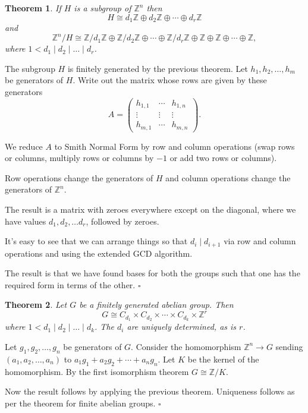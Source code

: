 \documentclass[10pt]{article}
\newtheorem{theorem}{Theorem}[section]
\newenvironment{proof}[1][Proof]{\begin{trivlist}
\item[\hskip \labelsep {\itshape #1}]}{\end{trivlist}}
\begin{document}
\begin{theorem}
If $H$ is a subgroup of $\mathbb{Z}^n$ then
$$H \cong d_1\mathbb{Z} \oplus d_2\mathbb{Z} \oplus \cdots \oplus d_r\mathbb{Z}$$ 
and
$$\mathbb{Z}^n/H \cong \mathbb{Z}/d_1\mathbb{Z} \oplus \mathbb{Z}/d_2\mathbb{Z} \oplus \cdots \oplus \mathbb{Z}/d_r\mathbb{Z}\oplus \mathbb{Z} \oplus \mathbb{Z} \oplus \cdots \oplus \mathbb{Z},$$
where $1 < d_1 \;|\; d_2 \;|\; \ldots \;|\; d_r$.
\end{theorem}

\begin{proof}
The subgroup $H$ is finitely generated by the previous theorem. Let $h_1, h_2, \ldots, h_m$ be generators of $H$. Write out the matrix whose rows are given by these generators
$$A = \left(\begin{array}{ccc}h_{1,1} & \cdots & h_{1,n}\\ \vdots & \vdots & \vdots\\ h_{m,1} & \cdots & h_{m, n}\end{array}\right).$$

We reduce $A$ to Smith Normal Form by row and column operations (swap rows or columns, multiply rows or columns by $-1$ or add two rows or columns).

Row operations change the generators of $H$ and column operations change the generators of $\mathbb{Z}^n$.

The result is a matrix with zeroes everywhere except on the diagonal, where we have values $d_1, d_2, \ldots d_r$, followed by zeroes.

It's easy to see that we can arrange things so that $d_i \;|\; d_{i+1}$ via row and column operations and using the extended GCD algorithm.

The result is that we have found bases for both the groups such that one has the required form in terms of the other. $\square$
\end{proof}

\begin{theorem}
Let $G$ be a finitely generated abelian group. Then
$$G \cong C_{d_1}\times C_{d_2}\times \cdots \times C_{d_k}\times \mathbb{Z}^r$$
where $1 < d_1 \;|\; d_2 \;|\; \ldots \;|\; d_k$. The $d_i$ are uniquely determined, as is $r$.
\end{theorem}

\begin{proof}
Let $g_1, g_2, \ldots, g_n$ be generators of $G$. Consider the homomorphism $\mathbb{Z}^n \to G$ sending $(a_1, a_2, \ldots, a_n)$ to $a_1g_1 + a_2g_2 + \cdots + a_ng_n$. Let $K$ be the kernel of the homomorphism. By the first isomorphism theorem $G \cong \mathbb{Z}/K$.

Now the result follows by applying the previous theorem. Uniqueness follows as per the theorem for finite abelian groups. $\square$
\end{proof}
\end{document}
